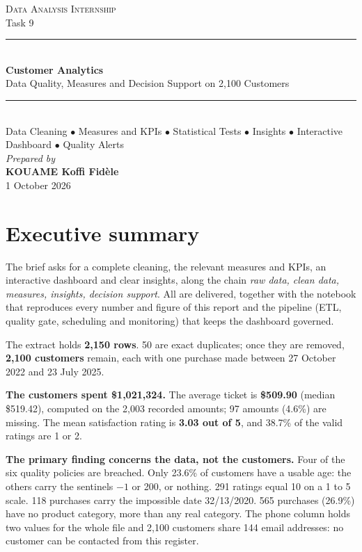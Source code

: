 \documentclass[12pt,a4paper]{article}
\begin{document}
\begin{titlepage}\centering
\singlespacing
\vspace*{3cm}
{\large\scshape Data Analysis Internship}\\[0.4cm]
{\normalsize Task 9}\\[2.0cm]
\rule{\linewidth}{0.5pt}\\[0.8cm]
{\LARGE\bfseries Customer Analytics}\\[0.6cm]
{\large Data Quality, Measures and Decision Support on 2{,}100 Customers}\\[0.8cm]
\rule{\linewidth}{0.5pt}\\[1.2cm]
{\normalsize Data Cleaning $\bullet$ Measures and KPIs $\bullet$ Statistical Tests
$\bullet$ Insights $\bullet$ Interactive Dashboard $\bullet$ Quality Alerts}\\[3.2cm]
{\large\itshape Prepared by}\\[0.5cm]
{\Large\bfseries KOUAME Koffi Fid\`ele}\\[0.6cm]
{\large 1 October 2026}
\vfill\end{titlepage}

\singlespacing
\tableofcontents\newpage
\onehalfspacing

\section{Executive summary}

The brief asks for a complete cleaning, the relevant measures and KPIs, an
interactive dashboard and clear insights, along the chain \emph{raw data, clean
data, measures, insights, decision support}. All are delivered, together with the
notebook that reproduces every number and figure of this report and the pipeline
(ETL, quality gate, scheduling and monitoring) that keeps the dashboard governed.

The extract holds \textbf{2{,}150 rows}. 50 are exact duplicates; once they are
removed, \textbf{2{,}100 customers} remain, each with one purchase made between
27 October 2022 and 23 July 2025.

\textbf{The customers spent \$1{,}021{,}324.} The average ticket is \textbf{\$509.90}
(median \$519.42), computed on the 2{,}003 recorded amounts; 97 amounts (4.6\%) are
missing. The mean satisfaction rating is \textbf{3.03 out of 5}, and 38.7\% of the
valid ratings are 1 or 2.

\textbf{The primary finding concerns the data, not the customers.} Four of the six
quality policies are breached. Only 23.6\% of customers have a usable age: the others
carry the sentinels $-1$ or 200, or nothing. 291 ratings equal 10 on a 1 to 5 scale.
118 purchases carry the impossible date 32/13/2020. 565 purchases (26.9\%) have no
product category, more than any real category. The phone column holds two values for
the whole file and 2{,}100 customers share 144 email addresses: no customer can be
contacted from this register.
\end{document}

